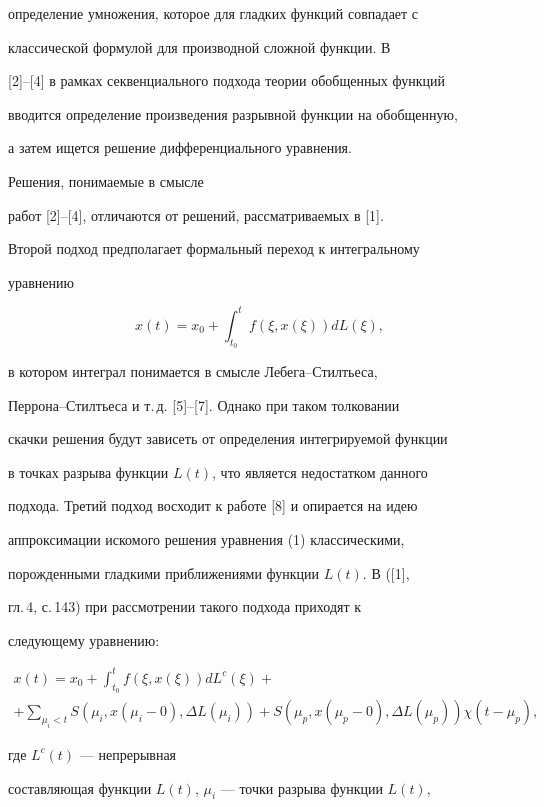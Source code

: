 определение умножения, которое для гладких функций совпадает с


классической формулой для производной сложной функции. В 


[2]--[4] в рамках секвенциального подхода теории обобщенных функций


вводится определение произведения разрывной функции на обобщенную,


а затем ищется решение дифференциального уравнения.


Решения, понимаемые в смысле


работ [2]--[4], отличаются от решений, рассматриваемых в [1].


Второй подход предполагает формальный переход к интегральному


уравнению


$$


x(t)=x_0+\int_{t_0}^{t}f(\xi,x(\xi))dL(\xi),


$$


в котором интеграл понимается в смысле Лебега--Стилтьеса,


Перрона--Стилтьеса и т.\,д. [5]--[7]. Однако при таком толковании


скачки решения будут зависеть от определения интегрируемой функции


в точках разрыва функции $L(t)$, что является недостатком данного


подхода. Третий подход восходит к работе [8] и опирается на идею


аппроксимации искомого решения уравнения (1) классическими,


порожденными гладкими приближениями функции $L(t)$. В ([1],


гл.\,4, с.\,143) при рассмотрении такого подхода приходят к


следующему уравнению:


\begin{multline*}


x(t)=x_0+\int_{t_0}^{t}f(\xi,x(\xi))dL^c(\xi)+ \\


%


+\sum_{\mu_i<t}S(\mu_i,x(\mu_i-0),\Delta


L(\mu_i))+S(\mu_p,x(\mu_p-0),\Delta L(\mu_p))\chi(t-\mu_p),


\end{multline*}


где $L^c(t)$ --- непрерывная


составляющая функции $L(t)$, $\mu_i$ --- точки разрыва функции $L(t)$,


